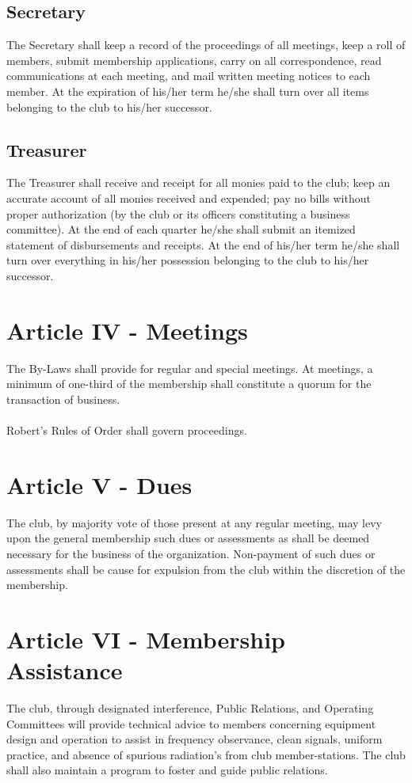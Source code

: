 \documentclass[english,12pt,letterpaper]{article}
\begin{document}
	\subsection{Secretary}
	The Secretary shall keep a record of the proceedings of all meetings, keep a roll of members, submit membership applications, carry on all correspondence, read communications at each meeting, and mail written meeting notices to each member. At the expiration of his/her term he/she shall turn over all items belonging to the club to his/her successor.
	\subsection{Treasurer}
	The Treasurer shall receive and receipt for all monies paid to the club; keep an accurate account of	all monies received and expended; pay no bills without proper authorization (by the club or its officers constituting a business committee). At the end of each quarter he/she shall submit an itemized statement of disbursements and receipts. At the end of his/her term he/she shall turn over everything in his/her possession belonging to the club to his/her successor.
	\section{Article IV - Meetings}
	The By-Laws shall provide for regular and special meetings. At meetings, a minimum of one-third of the membership shall constitute a quorum for the transaction of business. \\
	\\
	Robert's Rules of Order shall govern proceedings.
	\section{Article V - Dues}
	The club, by majority vote of those present at any regular meeting, may levy upon the general membership such dues or assessments as shall be deemed necessary for the business of the organization. Non-payment of such dues or assessments shall be cause for expulsion from the club within the discretion of the membership.
	\section{Article VI - Membership Assistance}
	The club, through designated interference, Public Relations, and Operating Committees will provide technical advice to members concerning equipment design and operation to assist in frequency observance, clean signals, uniform practice, and absence of spurious radiation's from club member-stations. The club shall also maintain a program to foster and guide public relations.
\end{document}
